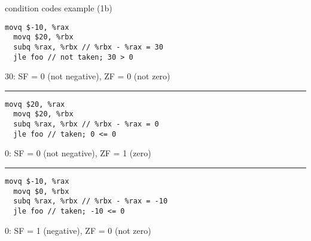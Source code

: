 \begin{frame}[fragile,label=ccEx1b]{condition codes example (1b)}
\begin{lstlisting}[style=small]
  movq $-10, %rax
  movq $20, %rbx
  subq %rax, %rbx // %rbx - %rax = 30 
  jle foo // not taken; 30 > 0
\end{lstlisting}
30: SF = 0 (not negative), ZF = 0 (not zero)
\hrule
\begin{lstlisting}[style=small]
  movq $20, %rax
  movq $20, %rbx
  subq %rax, %rbx // %rbx - %rax = 0
  jle foo // taken; 0 <= 0
\end{lstlisting}
0: SF = 0 (not negative), ZF = 1 (zero)
\hrule
\begin{lstlisting}[style=small]
  movq $-10, %rax
  movq $0, %rbx
  subq %rax, %rbx // %rbx - %rax = -10
  jle foo // taken; -10 <= 0
\end{lstlisting}
0: SF = 1 (negative), ZF = 0 (not zero)
\end{frame}

